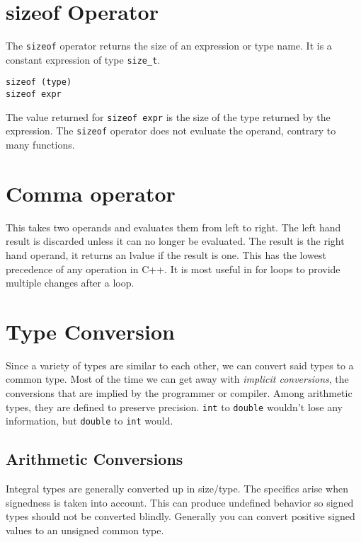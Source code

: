 \documentclass[12pt, a4paper]{report}
\begin{document}
\section{sizeof Operator}
The \verb|sizeof| operator returns the size of an expression or type name.
It is a constant expression of type \verb|size_t|.

\begin{center}
  \verb|sizeof (type)| \\
  \verb|sizeof expr| \\
\end{center}
The value returned for \verb|sizeof expr| is the size of the type returned by the expression.
The \verb|sizeof| operator does not evaluate the operand, contrary to many functions.

\section{Comma operator}
This takes two operands and evaluates them from left to right.
The left hand result is discarded unless it can no longer be evaluated.
The result is the right hand operand, it returns an lvalue if the result is one.
This has the lowest precedence of any operation in C++.
It is most useful in for loops to provide multiple changes after a loop.

\section{Type Conversion}
Since a variety of types are similar to each other, we can convert said types to a common type.
Most of the time we can get away with \emph{implicit conversions}, the conversions that are implied by the programmer or compiler.
Among arithmetic types, they are defined to preserve precision. 
\verb|int| to \verb|double| wouldn't lose any information, but \verb|double| to \verb|int| would.

\subsection{Arithmetic Conversions}
Integral types are generally converted up in size/type. 
The specifics arise when signedness is taken into account.
This can produce undefined behavior so signed types should not be converted blindly.
Generally you can convert positive signed values to an unsigned common type.
\end{document}
